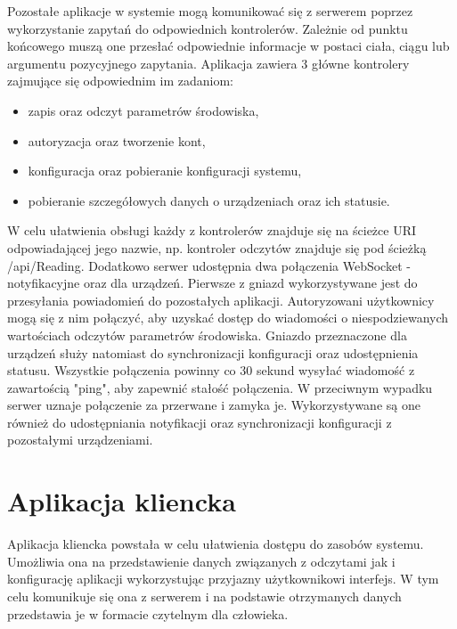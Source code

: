 Pozostałe aplikacje w systemie mogą komunikować się z serwerem poprzez wykorzystanie
zapytań do odpowiednich kontrolerów. Zależnie od punktu końcowego muszą one
przesłać odpowiednie informacje w postaci ciała, ciągu lub argumentu pozycyjnego
zapytania. Aplikacja zawiera 3 główne kontrolery zajmujące się odpowiednim im zadaniom:
\begin{itemize}
  \item zapis oraz odczyt parametrów środowiska,
  \item autoryzacja oraz tworzenie kont,
  \item konfiguracja oraz pobieranie konfiguracji systemu,
  \item pobieranie szczegółowych danych o urządzeniach oraz ich statusie.
\end{itemize}
W celu ułatwienia obsługi każdy z kontrolerów znajduje się na ścieżce URI odpowiadającej
jego nazwie, np. kontroler odczytów znajduje się pod ścieżką /api/Reading.
Dodatkowo serwer udostępnia dwa połączenia WebSocket - notyfikacyjne oraz
dla urządzeń. Pierwsze z gniazd wykorzystywane jest do przesyłania
powiadomień do pozostałych aplikacji. Autoryzowani użytkownicy mogą
się z nim połączyć, aby uzyskać dostęp do wiadomości o niespodziewanych
wartościach odczytów parametrów środowiska. Gniazdo przeznaczone dla
urządzeń służy natomiast do synchronizacji konfiguracji oraz
udostępnienia statusu. Wszystkie połączenia powinny co 30 sekund
wysyłać wiadomość z zawartością "ping", aby zapewnić stałość połączenia.
W przeciwnym wypadku serwer uznaje połączenie za przerwane i zamyka je.
Wykorzystywane są one również do udostępniania notyfikacji oraz
synchronizacji konfiguracji z pozostałymi urządzeniami.

\section{Aplikacja kliencka}
Aplikacja kliencka powstała w celu ułatwienia dostępu do zasobów systemu.
Umożliwia ona na przedstawienie danych związanych z odczytami jak i konfigurację
aplikacji wykorzystując przyjazny użytkownikowi interfejs. W tym celu komunikuje
się ona z serwerem i na podstawie otrzymanych danych przedstawia je w formacie
czytelnym dla człowieka. 

